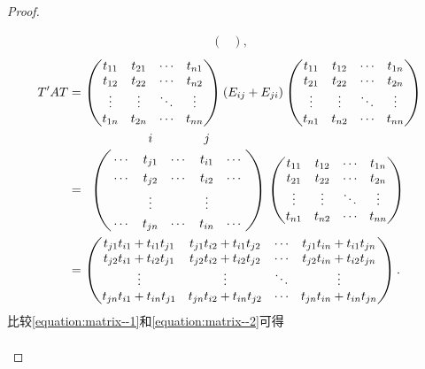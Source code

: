 \documentclass[../../main.tex]{subfiles}%
\begin{document}
\begin{proof}
\begin{enumerate}[(1)]
\begin{align}
\begin{pmatrix}
\end{pmatrix},\label{equation:matrix--1}
\end{align}
\begin{align}
T'AT &= \begin{pmatrix}
t_{11} & t_{21} & \cdots & t_{n1} \\
t_{12} & t_{22} & \cdots & t_{n2} \\
\vdots & \vdots & \ddots & \vdots \\
t_{1n} & t_{2n} & \cdots & t_{nn} \\
\end{pmatrix}
(E_{ij}+E_{ji})
\begin{pmatrix}
t_{11} & t_{12} & \cdots & t_{1n} \\
t_{21} & t_{22} & \cdots & t_{2n} \\
\vdots & \vdots & \ddots & \vdots \\
t_{n1} & t_{n2} & \cdots & t_{nn} \\
\end{pmatrix}
\nonumber
\\
&= \bordermatrix{%
&    &    i&       &   j&  \cr
& \cdots & t_{j1} & \cdots & t_{i1} & \cdots \cr
&\cdots & t_{j2} & \cdots & t_{i2} & \cdots \cr
&  & \vdots&  &\vdots &\cr
&\cdots & t_{jn} & \cdots & t_{in} & \cdots \cr
}
\begin{pmatrix}
t_{11} & t_{12} & \cdots & t_{1n} \\
t_{21} & t_{22} & \cdots & t_{2n} \\
\vdots & \vdots & \ddots & \vdots \\
t_{n1} & t_{n2} & \cdots & t_{nn} \\
\end{pmatrix}
\nonumber
\\
&= \begin{pmatrix}
t_{j1}t_{i1} + t_{i1}t_{j1} & t_{j1}t_{i2} + t_{i1}t_{j2} & \cdots & t_{j1}t_{in} + t_{i1}t_{jn} \\
t_{j2}t_{i1} + t_{i2}t_{j1} & t_{j2}t_{i2} + t_{i2}t_{j2} & \cdots & t_{j2}t_{in} + t_{i2}t_{jn} \\
\vdots & \vdots & \ddots & \vdots \\
t_{jn}t_{i1} + t_{in}t_{j1} & t_{jn}t_{i2} + t_{in}t_{j2} & \cdots & t_{jn}t_{in} + t_{in}t_{jn} \\
\end{pmatrix}.\label{equation:matrix--2}
\end{align}
比较\eqref{equation:matrix--1}和\eqref{equation:matrix--2}可得
\begin{align}

\end{align}
\end{enumerate}
\end{proof}
\end{document}
